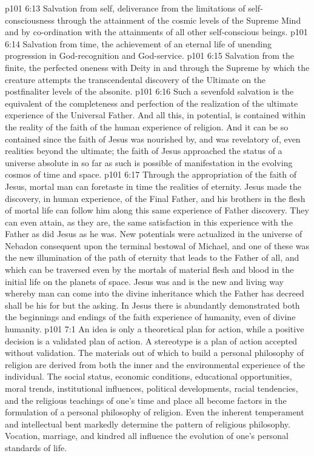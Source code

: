 \pc \vs p101 6:13 \bibnobreakspace Salvation from self, deliverance from the limitations of self\hyp{}consciousness through the attainment of the cosmic levels of the Supreme Mind and by co\hyp{}ordination with the attainments of all other self\hyp{}conscious beings.
\pc \vs p101 6:14 \bibnobreakspace Salvation from time, the achievement of an eternal life of unending progression in God\hyp{}recognition and God\hyp{}service.
\pc \vs p101 6:15 \bibnobreakspace Salvation from the finite, the perfected oneness with Deity in and through the Supreme by which the creature attempts the transcendental discovery of the Ultimate on the postfinaliter levels of the absonite.
\pc \vs p101 6:16 Such a sevenfold salvation is the equivalent of the completeness and perfection of the realization of the ultimate experience of the Universal Father. And all this, in potential, is contained within the reality of the faith of the human experience of religion. And it can be so contained since the faith of Jesus was nourished by, and was revelatory of, even realities beyond the ultimate; the faith of Jesus approached the status of a universe absolute in so far as such is possible of manifestation in the evolving cosmos of time and space.
\vs p101 6:17 Through the appropriation of the faith of Jesus, mortal man can foretaste in time the realities of eternity. Jesus made the discovery, in human experience, of the Final Father, and his brothers in the flesh of mortal life can follow him along this same experience of Father discovery. They can even attain, as they are, the same satisfaction in this experience with the Father as did Jesus as he was. New potentials were actualized in the universe of Nebadon consequent upon the terminal bestowal of Michael, and one of these was the new illumination of the path of eternity that leads to the Father of all, and which can be traversed even by the mortals of material flesh and blood in the initial life on the planets of space. Jesus was and is the new and living way whereby man can come into the divine inheritance which the Father has decreed shall be his for but the asking. In Jesus there is abundantly demonstrated both the beginnings and endings of the faith experience of humanity, even of divine humanity.\plustwo
{}
\vs p101 7:1 An idea is only a theoretical plan for action, while a positive decision is a validated plan of action. A stereotype is a plan of action accepted without validation. The materials out of which to build a personal philosophy of religion are derived from both the inner and the environmental experience of the individual. The social status, economic conditions, educational opportunities, moral trends, institutional influences, political developments, racial tendencies, and the religious teachings of one’s time and place all become factors in the formulation of a personal philosophy of religion. Even the inherent temperament and intellectual bent markedly determine the pattern of religious philosophy. Vocation, marriage, and kindred all influence the evolution of one’s personal standards of life.\plusone
